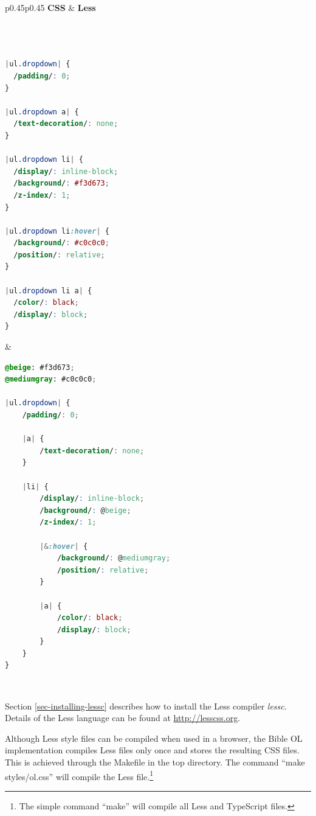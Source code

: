 \documentclass[11pt,oneside,a4paper]{memoir}
\begin{document}
\lstset{frame=} %

\begin{center}
\begin{tabular}{p{}p{}}
\hline
\textbf{CSS} & \textbf{Less}\\
\hline
\begin{lstlisting}[language=CSS,aboveskip=0mm,belowskip=0mm]



|ul.dropdown| {
  /padding/: 0;
}

|ul.dropdown a| {
  /text-decoration/: none;
}

|ul.dropdown li| {
  /display/: inline-block;
  /background/: #f3d673;
  /z-index/: 1;
}

|ul.dropdown li:hover| {
  /background/: #c0c0c0;
  /position/: relative;
}

|ul.dropdown li a| {
  /color/: black;
  /display/: block;
}
\end{lstlisting}

&

\begin{lstlisting}[language=CSS,aboveskip=0mm,belowskip=0mm]
@beige: #f3d673;
@mediumgray: #c0c0c0;

|ul.dropdown| {
    /padding/: 0;

    |a| {
        /text-decoration/: none;
    }

    |li| {
        /display/: inline-block;
        /background/: @beige;
        /z-index/: 1;

        |&:hover| {
            /background/: @mediumgray;
            /position/: relative;
        }

        |a| {
            /color/: black;
            /display/: block;
        }
    }
}
\end{lstlisting}\\
\hline
\end{tabular}
\end{center}


\lstset{frame=tb} %


Section \ref{sec-installing-lessc} describes how to install the Less compiler
\emph{lessc}. Details of the Less language can be found at \url{http://lesscss.org}.

Although Less style files can be compiled when used in a browser, the Bible OL implementation
compiles Less files only once and stores the resulting CSS files. This is achieved through the
Makefile in the top directory. The command ``make styles/ol.css'' will compile the Less
file.\footnote{The simple command ``make'' will compile all Less and TypeScript files.}
\end{document}
